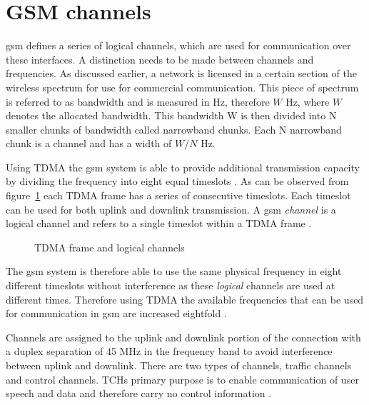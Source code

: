 \section{GSM channels}
\label{sec:interfacech}
\gls{gsm} defines a series of logical channels, which are used for communication over these interfaces. A distinction needs to be made between channels and frequencies. As discussed earlier, a network is licensed in a certain section of the wireless spectrum for use for commercial communication. This piece of spectrum is referred to as bandwidth and is measured in Hz, therefore $W$ Hz, where $W$ denotes the allocated bandwidth\cite{FundamentalsWirelessCommunication}. This bandwidth W is then divided into N smaller chunks of bandwidth called narrowband chunks. Each N narrowband chunk is a channel and has a width of $W/N$ Hz\cite{FundamentalsWirelessCommunication}. 

Using \gls{TDMA} the \gls{gsm} system is able to provide additional transmission capacity by dividing the frequency into eight equal timeslots \cite{wirelesstelcoMullet}. As can be observed from figure~\ref{fig:GSMfrequencies} each \gls{TDMA} frame has a series of consecutive timeslots. Each timeslot can be used for both uplink and downlink transmission. A \gls{gsm} \emph{channel} is a logical channel and refers to a single timeslot within a \gls{TDMA} frame \cite{wirelesstelcoMullet,GSMArchitectureProtocolsServices}.
\begin{figure}[H]
	\begin{centering}
		
		\caption{TDMA frame and logical channels \cite{wirelesstelcoMullet}}
		\label{fig:GSMfrequencies}
	\end{centering}
\end{figure}
The \gls{gsm} system is therefore able to use the same physical frequency in eight different timeslots without interference as these \emph{logical} channels are used at different times. Therefore using \gls{TDMA} the available frequencies that can be used for communication in \gls{gsm} are increased eightfold \cite{wirelesstelcoMullet}.

Channels are assigned to the uplink and downlink portion of the connection with a duplex separation of 45 MHz in the frequency band to avoid interference between uplink and downlink. There are two types of channels, traffic channels and control channels. \Glspl{TCH} primary purpose is to enable communication of user speech and data and therefore carry no control information \cite{GSMArchitectureProtocolsServices}.

